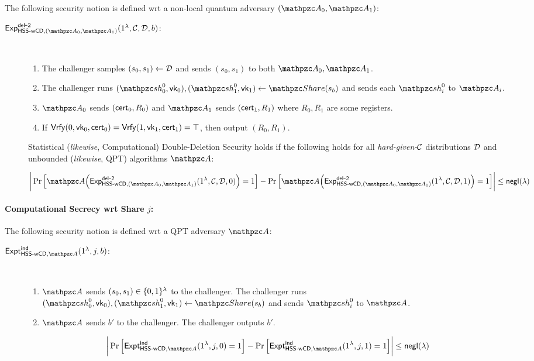 The following security notion is defined wrt a non-local quantum
adversary $(\qA_0, \qA_1)$:

\begin{description}
\item [$\expb{\HSSwcd, (\qA_0, \qA_1)}{del}{2}(1^\secp,
\calC, \calD, b)$:]
$ $
\begin{enumerate}
\item The challenger samples $(s_0, s_1) \leftarrow \mathcal{D}$ and
sends $(s_0, s_1)$ to both $\qA_0, \qA_1$.
\item The challenger runs
$(\qsh_0^0, \vk_0), (\qsh_1^0, \vk_1) \gets \Sh(s_b)$ and sends each
$\qsh_i^0$ to $\qA_i$.

\item $\qA_0$ sends $(\mathsf{cert}_0, R_0)$ and $\qA_{1}$ sends
$(\mathsf{cert}_{1}, R_{1})$ where $R_0, R_1$ are some registers.
\item If $\mathsf{Vrfy}(0, \mathsf{vk}_0, \mathsf{cert}_0) = \mathsf{Vrfy}(1, \mathsf{vk}_1, \mathsf{cert}_1)=
\top$, then output $(R_0, R_1)$.
\end{enumerate}

Statistical (\emph{likewise}, Computational) Double-Deletion
Security holds
if the following holds for all \emph{hard-given-$\mathcal{C}$}
distributions $\mathcal{D}$ and unbounded (\emph{likewise}, QPT)
algorithms $\qA$:

$$\bigg\lvert \Pr\Big[\qA\Big(\expb{\HSSwcd, (\qA_0,
\qA_1)}{del}{2}(1^\secp, \calC, \calD, 0)\Big)=1\Big] -
\Pr\Big[\qA\Big(\expb{\HSSwcd, (\qA_0,
\qA_1)}{del}{2}(1^\secp, \calC, \calD, 1)\Big)=1\Big]
\bigg\rvert \le \negl(\secp)$$
\end{description}

\paragraph{Computational Secrecy wrt Share $j$:}

The following security notion is defined wrt a QPT
adversary $\qA$:

\begin{description}
\item [$\expa{\HSSwcd, \qA}{ind}(1^\secp, j, b)$:] $ $
\begin{enumerate}
\item $\qA$ sends $(s_0, s_1) \in \{0,1\}^\lambda$
to the challenger. The challenger runs $(\qsh_0^0, \vk_0),
(\qsh_1^0, \vk_1) \leftarrow \Sh(s_b)$ and sends $\qsh_i^0$ to
$\qA$.
\item
$\qA$ sends $b'$ to the challenger. The challenger outputs $b'$.
\end{enumerate}

$$\bigg\lvert \Pr\Big[\expa{\HSSwcd, \qA}{ind}(1^\secp, j, 0)=1\Big]
-
\Pr\Big[\expa{\HSSwcd, \qA}{ind}(1^\secp, j, 1)=1\Big]
\bigg\rvert \le \negl(\secp)$$
\end{description}




